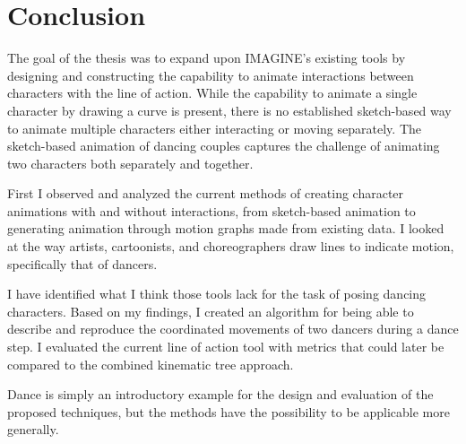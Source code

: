 \chapter{Conclusion}\label{chap:conclusion}
The goal of the thesis was to expand upon IMAGINE's existing tools by designing and constructing the capability to animate interactions between characters with the line of action. While the capability to animate a single character by drawing a curve is present, there is no established sketch-based way to animate multiple characters either interacting or moving separately. The sketch-based animation of dancing couples captures the challenge of animating two characters both separately and together.

First I observed and analyzed the current methods of creating character animations with and without interactions, from sketch-based animation to generating animation through motion graphs made from existing data. I looked at the way artists, cartoonists, and choreographers draw lines to indicate motion, specifically that of dancers.

I have identified what I think those tools lack for the task of posing dancing characters. Based on my findings, I created an algorithm for being able to describe and reproduce the coordinated movements of two dancers during a dance step. I evaluated the current line of action tool with metrics that could later be compared to the combined kinematic tree approach.

Dance is simply an introductory example for the design and evaluation of the proposed techniques, but the methods have the possibility to be applicable more generally.